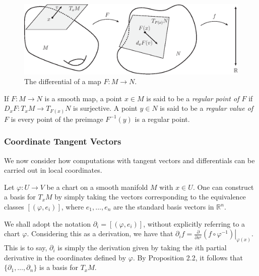 \documentclass[12pt,a4paper]{article}
\begin{document}
\begin{figure}[h!]
\centering
\includegraphics[scale=0.75]{fig/differential-1b}
\caption{The differential of a map $F:M\to N$.}
\label{fig:diff-1}
\end{figure}
\begin{definition}
If $F:M\to N$ is a smooth map, a point $x\in M$ is said to be a \textit{regular point of $F$} if $D_xF:T_xM\to T_{F(x)}N$ is surjective. A point $y\in N$ is said to be a \textit{regular value of $F$} is every point of the preimage $F^{-1}(y)$ is a regular point.
\end{definition}
\subsubsection{Coordinate Tangent Vectors}
We now consider how computations with tangent vectors and differentials can be carried out in local coordinates.

Let $\varphi:U\to V$ be a chart on a smooth manifold $M$ with $x\in U$. One can construct a basis for $T_xM$ by simply taking the vectors corresponding to the equivalence classes $[(\varphi,e_i)]$, where $e_1,\ldots,e_n$ are the standard basis vectors in $\mathbb{R}^n$. 

We shall adopt the notation $\partial_i=[(\varphi,e_i)]$, without explicitly referring to a chart $\varphi$. Considering this as a derivation, we have that $\partial_if=\left.\frac{\partial}{\partial x^i}(f\circ\varphi^{-1})\right\rvert_{\varphi(x)}$. This is to say, $\partial_i$ is simply the derivation given by taking the $i$th partial derivative in the coordinates defined by $\varphi$. By Proposition 2.2, it follows that $\{\partial_1,\ldots,\partial_n\}$ is a basis for $T_xM$.
\end{document}
